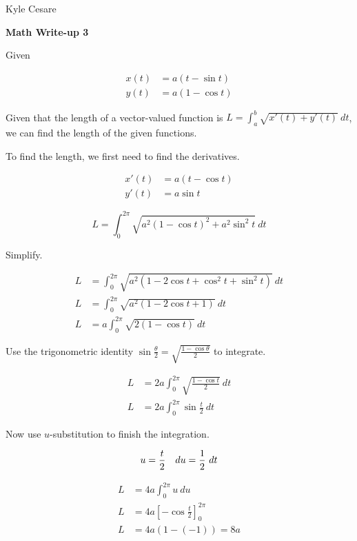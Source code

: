 \documentclass[11pt]{article}
\begin{document}
\begin{flushright}
  Kyle Cesare
\end{flushright}

{\center \textbf{Math Write-up 3} \\}

Given

\begin{align*}
  x(t) &= a(t - \sin t) \\
  y(t) &= a(1 - \cos t)
\end{align*}

Given that the length of a vector-valued function is $L = \int_a^b \sqrt{x'(t) +
y'(t)} \ dt$, we can find the length of the given functions.

To find the length, we first need to find the derivatives.

\begin{align*}
  x'(t) &= a(t - \cos t) \\
  y'(t) &= a\sin t
\end{align*}

$$
  L = \int_0^{2\pi} \sqrt{a^2(1-\cos t)^2 + a^2\sin^2 t} \ dt
$$

Simplify.

\begin{align*}
  L &= \int_0^{2\pi} \sqrt{a^2(1 - 2\cos t + \cos^2 t + \sin^2 t)} \ dt \\
  L &= \int_0^{2\pi} \sqrt{a^2(1 - 2\cos t + 1)} \ dt \\
  L &= a \int_0^{2\pi} \sqrt{2(1 - \cos t)} \ dt
\end{align*}

Use the trigonometric identity $\sin \frac{\theta}{2} = \sqrt{\frac{1 -
\cos\theta}{2}}$ to integrate.

\begin{align*}
  L &= 2a \int_0^{2\pi} \sqrt{\frac{1 - \cos t}{2}} \ dt \\
  L &= 2a \int_0^{2\pi} \sin\frac{t}{2} \ dt
\end{align*}

Now use $u$-substitution to finish the integration.

$$
  u = \frac{t}{2} \quad du = \frac{1}{2} \ dt \\
$$

\begin{align*}
  L &= 4a \int_0^{2\pi} u \ du \\
  L &= 4a \left[ -\cos\frac{t}{2} \right]_0^{2\pi} \\
  L &= 4a(1 - (-1)) = 8a
\end{align*}
\end{document}
